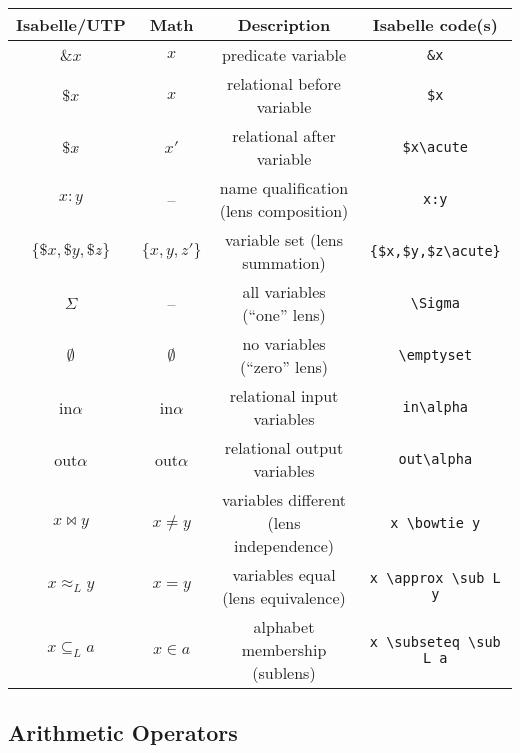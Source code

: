 \documentclass[11pt]{article}
\begin{document}
\begin{center}
\begin{tabular}{|c|c|c|c|} \hline
  \textbf{Isabelle/UTP}    & \textbf{Math}      & \textbf{Description}                  & \textbf{Isabelle code(s)} \\ \hline
  $\&x$                    & $x$                & predicate variable                    & \verb|&x| \\
  $\mathdollar x$          & $x$                & relational before variable            & \verb|$x| \\
  $\mathdollar x \acute{}$ & $x'$               & relational after variable             & \verb|$x\acute| \\
  $x\!:\!y$                & --                 & name qualification (lens composition) & \verb|x:y| \\
  $\{\mathdollar x,\mathdollar y, \mathdollar z \acute{}\}$  
                           & $\{x,y,z'\}$       & variable set (lens summation)         & \verb|{$x,$y,$z\acute}| \\
  $\Sigma$                 & --                 & all variables (``one'' lens)          & \verb|\Sigma| \\
  $\emptyset$              & $\emptyset$        & no variables (``zero'' lens)          & \verb|\emptyset| \\
  in$\alpha$               & in$\alpha$         & relational input variables            & \verb|in\alpha| \\
  out$\alpha$              & out$\alpha$        & relational output variables           & \verb|out\alpha| \\
  $x \mathop{\bowtie} y$   & $x \neq y$         & variables different (lens independence) & \verb|x \bowtie y| \\
  $x \approx_L y$          & $x = y$            & variables equal (lens equivalence)     & \verb|x \approx \sub L y| \\
  $x \subseteq_L a$        & $x \in a$          & alphabet membership (sublens)         & \verb|x \subseteq \sub L a| \\
  \hline
\end{tabular}
\end{center}

\newpage

\subsection{Arithmetic Operators}
\end{document}
